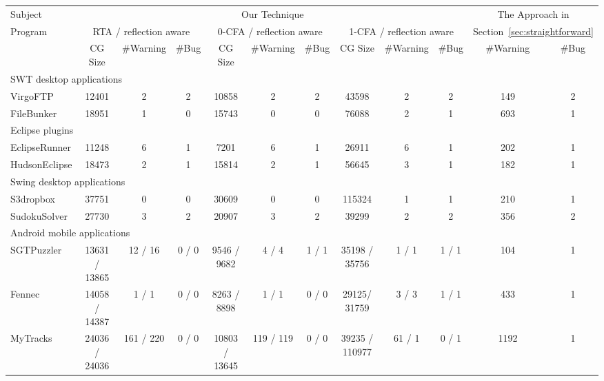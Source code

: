 \begin{table*}[ht]
\begin{center}
 \fontsize{9pt}{\baselineskip}\selectfont
\hspace*{-0.2cm}
\setlength{\tabcolsep}{.45\tabcolsep}
\begin{tabular}{|l||c|c|c||c|c|c||c|c|c||c|c|}
\hline
 Subject&  \multicolumn{9}{|c||}{Our Technique} & \multicolumn{2}{|c|}{The Approach in}  \\
\cline{2-10}
 Program  &  \multicolumn{3}{|c|}{RTA / reflection aware}& \multicolumn{3}{|c|}{0-CFA / reflection aware} & \multicolumn{3}{|c||}{1-CFA / reflection aware} & \multicolumn{2}{|c|}{Section~\ref{sec:straightforward}}  \\
\cline{2-12}
 & CG Size & \#Warning & \#Bug & CG Size & \#Warning & \#Bug & CG Size & \#Warning & \#Bug & \#Warning & \#Bug\\
\hline \hline
\multicolumn{12}{|l|}{SWT desktop applications}   \\
 \hline
 VirgoFTP&  12401 &  2 &  2 & 10858 & 2 & 2 & 43598 & 2 & 2& 149 & 2 \\
 \hline
 FileBunker &  18951 &  1 &  0 & 15743 & 0 & 0 & 76088 & 2 & 1& 693 & 1 \\
 \hline
 \hline
\multicolumn{12}{|l|}{Eclipse plugins}   \\
 \hline
 EclipseRunner&  11248&  6 &  1 & 7201 & 6 & 1 & 26911 & 6 & 1& 202 & 1 \\
 \hline
 HudsonEclipse& 18473 &  2 &  1 & 15814 & 2 & 1& 56645 & 3 & 1 & 182 & 1 \\
 \hline
 \hline
\multicolumn{12}{|l|}{Swing desktop applications}   \\
 \hline
 S3dropbox & 37751 &  0 &  0 & 30609 & 0 & 0 & 115324 & 1 & 1 & 210 & 1 \\
 \hline
  SudokuSolver&  27730&  3 &  2 & 20907 & 3 & 2 & 39299 & 2 & 2 & 356 & 2 \\
 \hline
 \hline
\multicolumn{12}{|l|}{Android mobile applications}   \\
 \hline
 SGTPuzzler & 13631 / 13865&  12 / 16 &  0 / 0 & 9546 / 9682& 4 / 4& 1 / 1 & 35198 / 35756 & 1 / 1  & 1 / 1& 104 & 1 \\
 \hline
 Fennec & 14058 / 14387 &  1 / 1 &  0 / 0 & 8263 / 8898 & 1 / 1 & 0 / 0& 29125/ 31759 & 3 / 3 & 1 / 1& 433 & 1 \\
 \hline
 MyTracks & 24036 / 24036 &  161 / 220 & 0 / 0 & 10803 / 13645 & 119 / 119 & 0 / 0 & 39235 / 110977 & 61 / 1 & 0 / 1 & 1192 & 1 \\

\end{tabular}
\end{center}
\end{table*}
